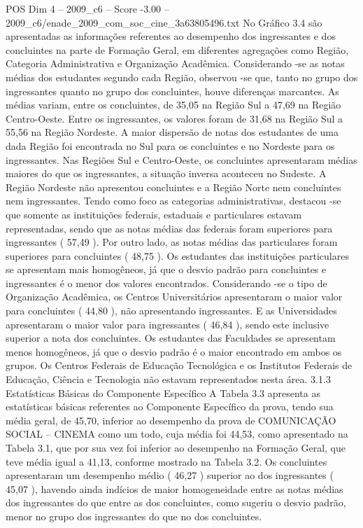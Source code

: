 \begin{textsample}{POS Dim 4 – 2009\_c6 – Score -3.00 – 2009\_c6/enade\_2009\_com\_soc\_cine\_3a63805496.txt}
No Gráfico 3.4 são apresentadas as informações referentes ao desempenho dos ingressantes e dos concluintes na parte de Formação Geral, em diferentes agregações como Região, Categoria Administrativa e Organização Acadêmica.
Considerando -se as notas médias dos estudantes segundo cada Região, observou -se que, tanto no grupo dos ingressantes quanto no grupo dos concluintes, houve diferenças marcantes.
As médias variam, entre os concluintes, de 35,05 na Região Sul a 47,69 na Região Centro-Oeste.
Entre os ingressantes, os valores foram de 31,68 na Região Sul a 55,56 na Região Nordeste.
A maior dispersão de notas dos estudantes de uma dada Região foi encontrada no Sul para os concluintes e no Nordeste para os ingressantes.
Nas Regiões Sul e Centro-Oeste, os concluintes apresentaram médias maiores do que os ingressantes, a situação inversa aconteceu no Sudeste.
A Região Nordeste não apresentou concluintes e a Região Norte nem concluintes nem ingressantes.
Tendo como foco as categorias administrativas, destacou -se que somente as instituições federais, estaduais e particulares estavam representadas, sendo que as notas médias das federais foram superiores para ingressantes ( 57,49 ).
Por outro lado, as notas médias das particulares foram superiores para concluintes ( 48,75 ).
Os estudantes das instituições particulares se apresentam mais homogêneos, já que o desvio padrão para concluintes e ingressantes é o menor dos valores encontrados.
Considerando -se o tipo de Organização Acadêmica, os Centros Universitários apresentaram o maior valor para concluintes ( 44,80 ), não apresentando ingressantes.
E as Universidades apresentaram o maior valor para ingressantes ( 46,84 ), sendo este inclusive superior a nota dos concluintes.
Os estudantes das Faculdades se apresentam menos homogêneos, já que o desvio padrão é o maior encontrado em ambos os grupos.
Os Centros Federais de Educação Tecnológica e os Institutos Federais de Educação, Ciência e Tecnologia não estavam representados nesta área. 3.1.3 Estatísticas Básicas do Componente Específico A Tabela 3.3 apresenta as estatísticas básicas referentes ao Componente Específico da prova, tendo sua média geral, de 45,70, inferior ao desempenho da prova de COMUNICAÇÃO SOCIAL – CINEMA como um todo, cuja média foi 44,53, como apresentado na Tabela 3.1, que por sua vez foi inferior ao desempenho na Formação Geral, que teve média igual a 41,13, conforme mostrado na Tabela 3.2.
Os concluintes apresentaram um desempenho médio ( 46,27 ) superior ao dos ingressantes ( 45,07 ), havendo ainda indícios de maior homogeneidade entre as notas médias dos ingressantes do que entre as dos concluintes, como sugeriu o desvio padrão, menor no grupo dos ingressantes do que no dos concluintes.

\end{textsample}
